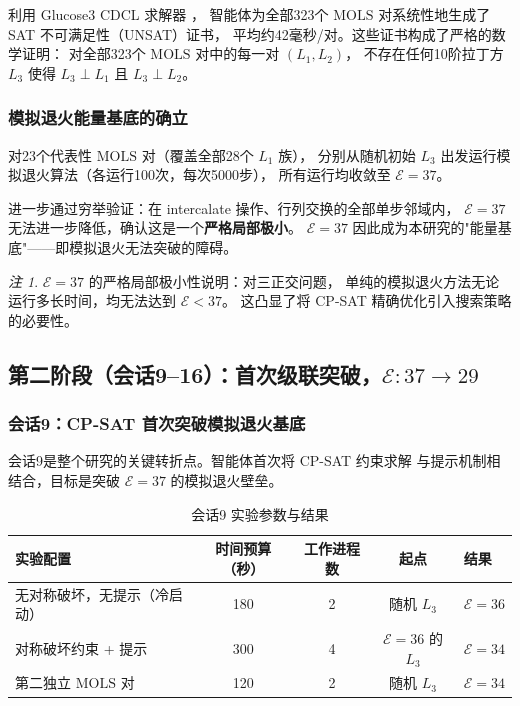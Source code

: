 \documentclass[11pt,a4paper]{ctexart}
\theoremstyle{remark}
\newtheorem{remark}[theorem]{注}
\newcommand{\E}{\mathcal{E}}
\newcommand{\MOLS}{\mathrm{MOLS}}
\begin{document}
利用 Glucose3 CDCL 求解器 \cite{audemard2009}，
智能体为全部323个 $\MOLS$ 对系统性地生成了 SAT 不可满足性（UNSAT）证书，
平均约42毫秒/对。这些证书构成了严格的数学证明：
对全部323个 $\MOLS$ 对中的每一对 $(L_1, L_2)$，
不存在任何10阶拉丁方 $L_3$ 使得 $L_3 \perp L_1$ 且 $L_3 \perp L_2$。


\subsubsection{模拟退火能量基底的确立}

对23个代表性 $\MOLS$ 对（覆盖全部28个 $L_1$ 族），
分别从随机初始 $L_3$ 出发运行模拟退火算法（各运行100次，每次5000步），
所有运行均收敛至 $\E = 37$。

进一步通过穷举验证：在 intercalate 操作、行列交换的全部单步邻域内，
$\E = 37$ 无法进一步降低，确认这是一个\textbf{严格局部极小}。
$\E = 37$ 因此成为本研究的"能量基底"——即模拟退火无法突破的障碍。

\begin{remark}
  $\E = 37$ 的严格局部极小性说明：对三正交问题，
  单纯的模拟退火方法无论运行多长时间，均无法达到 $\E < 37$。
  这凸显了将 CP-SAT 精确优化引入搜索策略的必要性。
\end{remark}

\subsection{第二阶段（会话9--16）：首次级联突破，$\E : 37 \to 29$}

\subsubsection{会话9：CP-SAT 首次突破模拟退火基底}

会话9是整个研究的关键转折点。智能体首次将 CP-SAT 约束求解
与提示机制相结合，目标是突破 $\E = 37$ 的模拟退火壁垒。

\begin{table}[htbp]
  \centering
  \caption{会话9 实验参数与结果}
  \label{tab:session9}
  \begin{tabular}{lcccl}
    \toprule
    实验配置 & 时间预算（秒） & 工作进程数 & 起点 & 结果 \\
    \midrule
    无对称破坏，无提示（冷启动） & 180 & 2 & 随机 $L_3$ & $\E = 36$ \\
    对称破坏约束 + 提示 & 300 & 4 & $\E=36$ 的 $L_3$ & $\E = 34$ \\
    第二独立 $\MOLS$ 对 & 120 & 2 & 随机 $L_3$ & $\E = 34$ \\
    \bottomrule
  \end{tabular}
\end{table}
\end{document}
